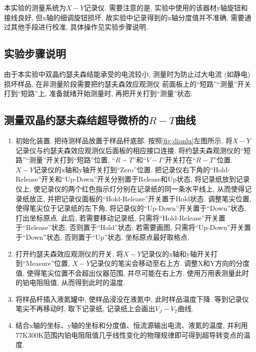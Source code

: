 \documentclass[font=default]{mpltx}
\newcommand{\note}[1]{{\color{gray}#1}}
\newcommand*\cs[1]{\texttt{\textbackslash #1}}
\begin{document}
  \par
  本实验的测量系统为$X-Y$记录仪. 需要注意的是, 实验中使用的该器材y轴旋钮和接线良好, 但x轴的细调旋钮损坏, 故实验中记录得到的x轴分度值并不准确, 需要通过其他手段进行校准, 具体操作见实验步骤说明.



\subsection{实验步骤说明}
  由于本实验中双晶约瑟夫森结能承受的电流较小, 测量时为防止过大电流 (如静电) 损坏样品, 在非测量阶段需要把约瑟夫森效应观测仪 前面板上的“短路”“测量”开关打到“短路”上, 准备就绪开始测量时, 再把开关打到“测量”状态.

  \subsection{测量双晶约瑟夫森结超导微桥的$R-T$曲线}
  \begin{enumerate}
    \item 初始化装置. 把待测样品放置于样品杆底部. 按照\autoref{fig:dianlu}左图所示, 将$X-Y$记录仪与约瑟夫森效应观测仪后面板的相应接口连接. 将约瑟夫森观测仪的“短路”“测量”开关打到“短路”位置, “$R-T$”和“$V-I$”开关打在“$R-T$”位置. 
    $X-Y$记录仪的x轴和y轴开关打到“Zero”位置. 把记录仪右下角的“Hold-Release”开关和“Up-Down”开关分别置于Release和Up状态, 将记录纸放到记录仪上, 使记录仪的两个红色指示灯分别在记录纸的同一条水平线上, 从而使得记录纸放正, 并把记录仪面板的“Hold-Release”开关置于Hold状态. 
    调整笔尖位置, 使得笔尖位于记录纸的左下角, 将记录仪的“Up-Down”开关置于“Down”状态, 打出坐标原点. 此后, 若需要移动记录纸, 只需将“Hold-Release”开关置于“Release”状态, 否则置于“Hold”状态; 若需要画图, 只需将“Up-Down”开关置于“Down”状态, 否则置于“Up”状态. 坐标原点最好取格点.

    \item 打开约瑟夫森效应观测仪的开关,  将$X-Y$记录仪的x轴和y轴开关打到“Measure”位置, $X-Y$记录仪的笔尖会移动至右上方. 调整X和Y方向的分度值, 使得笔尖位置不会超出仪器范围, 并尽可能在右上方. 使用万用表测量此时的铂电阻阻值, 从而得到此时的温度. 
    \item 将样品杆插入液氮罐中, 使样品浸没在液氮中, 此时样品温度下降. 等到记录仪笔尖不再移动时, 取下记录纸, 记录纸上会画出$V_J-V_T$曲线. 
    \item 结合x轴的坐标、y轴的坐标和分度值、恒流源输出电流、液氮的温度, 并利用77K\textasciiacute300K范围内铂电阻阻值几乎线性变化的物理规律即可得到超导转变点的温度. 
  \end{enumerate}
\end{document}
